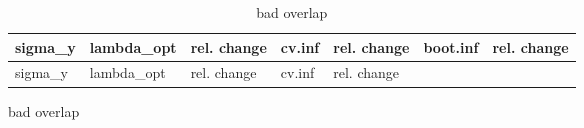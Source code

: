 \documentclass[
  letterpaper,
  DIV=11,
  numbers=noendperiod]{scrartcl}
\begin{document}
\begin{figure}
\begin{minipage}[t]{0.50\linewidth}
\begin{longtable}[]{@{}
  >{\raggedleft\arraybackslash}p{}
  >{\raggedleft\arraybackslash}p{}
  >{\raggedleft\arraybackslash}p{}
  >{\raggedleft\arraybackslash}p{}
  >{\raggedleft\arraybackslash}p{}
  >{\raggedleft\arraybackslash}p{}
  >{\raggedleft\arraybackslash}p{}@{}}
\caption{bad overlap}\tabularnewline
\toprule\noalign{}
\begin{minipage}[b]{\linewidth}\raggedleft
sigma\_y
\end{minipage} & \begin{minipage}[b]{\linewidth}\raggedleft
lambda\_opt
\end{minipage} & \begin{minipage}[b]{\linewidth}\raggedleft
rel. change
\end{minipage} & \begin{minipage}[b]{\linewidth}\raggedleft
cv.inf
\end{minipage} & \begin{minipage}[b]{\linewidth}\raggedleft
rel. change
\end{minipage} & \begin{minipage}[b]{\linewidth}\raggedleft
boot.inf
\end{minipage} & \begin{minipage}[b]{\linewidth}\raggedleft
rel. change
\end{minipage} \\
\midrule\noalign{}
\endfirsthead
\toprule\noalign{}
\begin{minipage}[b]{\linewidth}\raggedleft
sigma\_y
\end{minipage} & \begin{minipage}[b]{\linewidth}\raggedleft
lambda\_opt
\end{minipage} & \begin{minipage}[b]{\linewidth}\raggedleft
rel. change
\end{minipage} & \begin{minipage}[b]{\linewidth}\raggedleft
cv.inf
\end{minipage} & \begin{minipage}[b]{\linewidth}\raggedleft
rel. change
\end{minipage} & \begin{minipage}[b]{\linewidth}\raggedleft

\end{minipage}
\end{longtable}
\end{minipage}
\end{figure}
\end{document}
